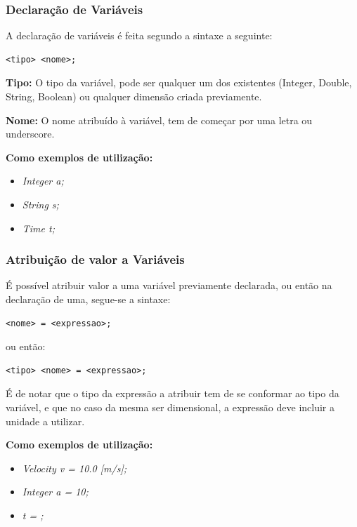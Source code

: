 \documentclass[10pt,portuguese]{article}
\begin{document}
\subsubsection{Declaração de Variáveis}
\par A declaração de variáveis é feita segundo a sintaxe a seguinte:
\begin{lstlisting}[numbers=none]
<tipo> <nome>;
\end{lstlisting}
\newline
\par \textbf{Tipo:} O tipo da variável, pode ser qualquer um dos existentes (Integer, Double, String, Boolean) ou qualquer dimensão criada previamente.
\par \textbf{Nome:} O nome atribuído à variável, tem de começar por uma letra ou underscore.
\newline
\par \textbf{Como exemplos de utilização:}
\begin{itemize}
    \item \textit{Integer a;}
    \item \textit{String s;}
    \item \textit{Time t;}
\end{itemize}

\subsubsection{Atribuição de valor a Variáveis}
\par É possível atribuir valor a uma variável previamente declarada, ou então na declaração de uma, segue-se a sintaxe:
\begin{lstlisting}[numbers=none]
<nome> = <expressao>;
\end{lstlisting}
\par ou então:
\begin{lstlisting}[numbers=none]
<tipo> <nome> = <expressao>;
\end{lstlisting}
\newline
\par É de notar que o tipo da expressão a atribuir tem de se conformar ao tipo da variável, e que no caso da mesma ser dimensional, a expressão deve incluir a unidade a utilizar.
\par \textbf{Como exemplos de utilização:}
\begin{itemize}
    \item \textit{Velocity v = 10.0 [m/s];}
    \item \textit{Integer a = 10;}
    \item \textit{t = ;}
\end{itemize}
\end{document}

